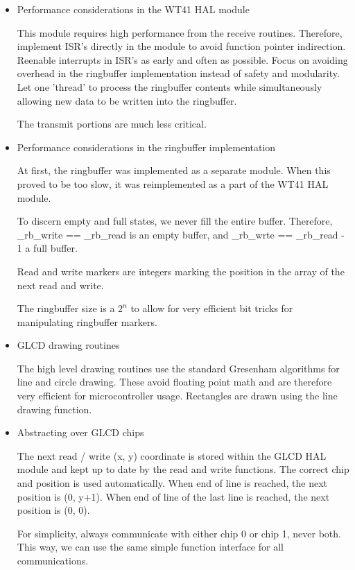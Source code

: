 \documentclass[12pt,a4paper,titlepage,oneside]{article}
\begin{document}
\begin{itemize}


 \item Performance considerations in the WT41 HAL module
 
 This module requires high performance from the receive routines. Therefore,
 implement ISR's directly in the module to avoid function pointer indirection.
 Reenable interrupts in ISR's as early and often as possible. Focus on avoiding
 overhead in the ringbuffer implementation instead of safety and modularity.
 Let one 'thread' to process the ringbuffer contents while simultaneously
 allowing new data to be written into the ringbuffer.
 
 The transmit portions are much less critical.
 
 
 \item Performance considerations in the ringbuffer implementation
 
 At first, the ringbuffer was implemented as a separate module. When this
 proved to be too slow, it was reimplemented as a part of the WT41 HAL module.
 
 To discern empty and full states, we never fill the entire buffer. Therefore,
 \_rb\_write == \_rb\_read is an empty buffer, and \_rb\_wrte == \_rb\_read - 1 a full buffer.
 
 Read and write markers are integers marking the position in the array of the 
 next read and write.
 
 The ringbuffer size is a $2^n$ to allow for very efficient bit tricks for manipulating
 ringbuffer markers.

 
 \item GLCD drawing routines
 
 The high level drawing routines use the standard Gresenham algorithms for line and circle
 drawing. These avoid floating point math and are therefore very efficient for
 microcontroller usage. Rectangles are drawn using the line drawing function.
 
 
 \item Abstracting over GLCD chips
 
 The next read / write (x, y) coordinate is stored within the GLCD HAL module and kept
 up to date by the read and write functions. The correct chip and position is used
 automatically. When end of line is reached, the next position is (0, y+1). When end of line
 of the last line is reached, the next position is (0, 0).
 
 For simplicity, always communicate with either chip 0 or chip 1, never both. This way,
 we can use the same simple function interface for all communications.
 

\end{itemize}
\end{document}

